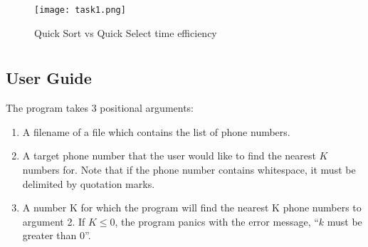 \documentclass{report}
\begin{document}
\begin{figure}[H]
	\centering
	\texttt{[image: task1.png]}
	\caption{Quick Sort vs Quick Select time efficiency}
	\label{fig:task1_time_eff}
\end{figure}

\chapter{}

\section{User Guide}
The program takes 3 positional arguments:
\begin{enumerate}
	\item A filename of a file which contains the list of phone numbers.
	\item A target phone number that the user would like to find the nearest \(K\) numbers for. Note that if the phone number contains whitespace, it must be delimited by quotation marks.
	\item A number K for which the program will find the nearest K phone numbers to argument 2. If \(K \le 0\), the program panics with the error message, ``\(k\) must be greater than 0''.
\end{enumerate}
\end{document}
